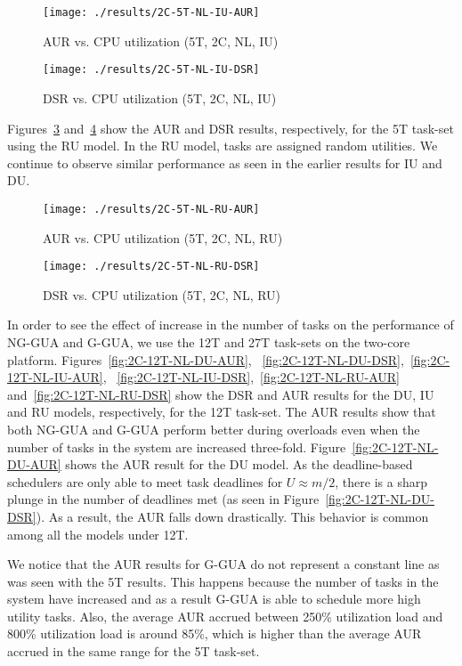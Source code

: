 \documentclass[12pt,dvips]{report}
\begin{document}
\begin{figure} [htbp]
  \centering
  \texttt{[image: ./results/2C-5T-NL-IU-AUR]}
  \caption{AUR vs. CPU utilization (5T, 2C, NL, IU)}
   \label{fig:2C-5T-NL-IU-AUR}
\end{figure}
 
\begin{figure} [htbp]
  \centering
  \texttt{[image: ./results/2C-5T-NL-IU-DSR]}
  \caption{DSR vs. CPU utilization (5T, 2C, NL, IU)}
  \label{fig:2C-5T-NL-IU-DSR}
\end{figure}
 
 
Figures~\ref{fig:2C-5T-NL-RU-AUR} and~\ref{fig:2C-5T-NL-RU-DSR} show the AUR and DSR results, respectively, for the 5T task-set using the RU model. In the RU model, tasks are assigned random utilities. We continue to observe similar performance as seen in the earlier results for IU and DU.

\begin{figure} [htbp]
  \centering
  \texttt{[image: ./results/2C-5T-NL-RU-AUR]}
  \caption{AUR vs. CPU utilization (5T, 2C, NL, RU)}
  \label{fig:2C-5T-NL-RU-AUR}
\end{figure}

\begin{figure} [htbp]
  \centering
  \texttt{[image: ./results/2C-5T-NL-RU-DSR]}
  \caption{DSR vs. CPU utilization (5T, 2C, NL, RU)}
  \label{fig:2C-5T-NL-RU-DSR}
\end{figure}


In order to see the effect of increase in the number of tasks on the performance of NG-GUA and G-GUA, we use the 12T and 27T task-sets on the two-core platform. Figures~\ref{fig:2C-12T-NL-DU-AUR}, ~\ref{fig:2C-12T-NL-DU-DSR},~\ref{fig:2C-12T-NL-IU-AUR}, ~\ref{fig:2C-12T-NL-IU-DSR},~\ref{fig:2C-12T-NL-RU-AUR} and~\ref{fig:2C-12T-NL-RU-DSR} show the DSR and AUR results for the DU, IU and RU models, respectively, for the 12T task-set. The AUR results show that both NG-GUA and G-GUA perform better during overloads even when the number of tasks in the system are increased three-fold. Figure~\ref{fig:2C-12T-NL-DU-AUR} shows the AUR result for the DU model. As the deadline-based schedulers are only able to meet task deadlines for $U \approx m/2$, there is a sharp plunge in the number of deadlines met (as seen in Figure~\ref{fig:2C-12T-NL-DU-DSR}). As a result, the AUR falls down drastically. This behavior is common among all the models under 12T.

We notice that the AUR results for G-GUA do not represent a constant line as was seen with the 5T results.  This happens because the number of tasks in the system have increased and as a result G-GUA is able to schedule more high utility tasks. Also, the average AUR accrued between 250\% utilization load and 800\% utilization load is around 85\%, which is higher than the average AUR accrued in the same range for the 5T task-set.
\end{document}
